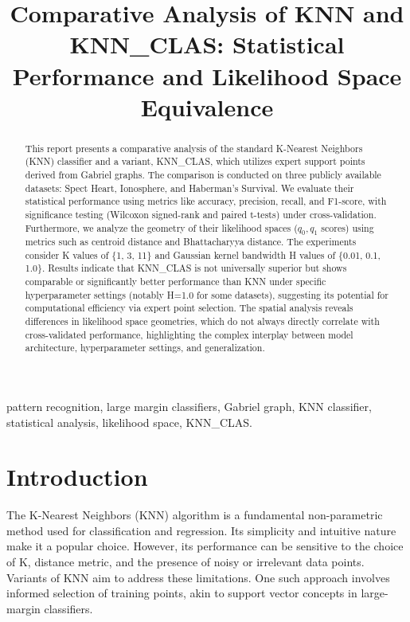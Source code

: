 \documentclass[conference]{IEEEtran}
\begin{document}
\title{Comparative Analysis of KNN and KNN\_CLAS: Statistical Performance and Likelihood Space Equivalence}

\author{
}

\maketitle

\begin{abstract}
This report presents a comparative analysis of the standard K-Nearest Neighbors (KNN) classifier and a variant, KNN\_CLAS, which utilizes expert support points derived from Gabriel graphs. The comparison is conducted on three publicly available datasets: Spect Heart, Ionosphere, and Haberman's Survival. We evaluate their statistical performance using metrics like accuracy, precision, recall, and F1-score, with significance testing (Wilcoxon signed-rank and paired t-tests) under cross-validation. Furthermore, we analyze the geometry of their likelihood spaces ($q_0, q_1$ scores) using metrics such as centroid distance and Bhattacharyya distance. The experiments consider K values of \{1, 3, 11\} and Gaussian kernel bandwidth H values of \{0.01, 0.1, 1.0\}. Results indicate that KNN\_CLAS is not universally superior but shows comparable or significantly better performance than KNN under specific hyperparameter settings (notably H=1.0 for some datasets), suggesting its potential for computational efficiency via expert point selection. The spatial analysis reveals differences in likelihood space geometries, which do not always directly correlate with cross-validated performance, highlighting the complex interplay between model architecture, hyperparameter settings, and generalization.
\end{abstract}

\begin{IEEEkeywords}
pattern recognition, large margin classifiers, Gabriel graph, KNN classifier, statistical analysis, likelihood space, KNN\_CLAS.
\end{IEEEkeywords}

\section{Introduction}
The K-Nearest Neighbors (KNN) algorithm is a fundamental non-parametric method used for classification and regression. Its simplicity and intuitive nature make it a popular choice. However, its performance can be sensitive to the choice of K, distance metric, and the presence of noisy or irrelevant data points. Variants of KNN aim to address these limitations. One such approach involves informed selection of training points, akin to support vector concepts in large-margin classifiers.
\end{document}
